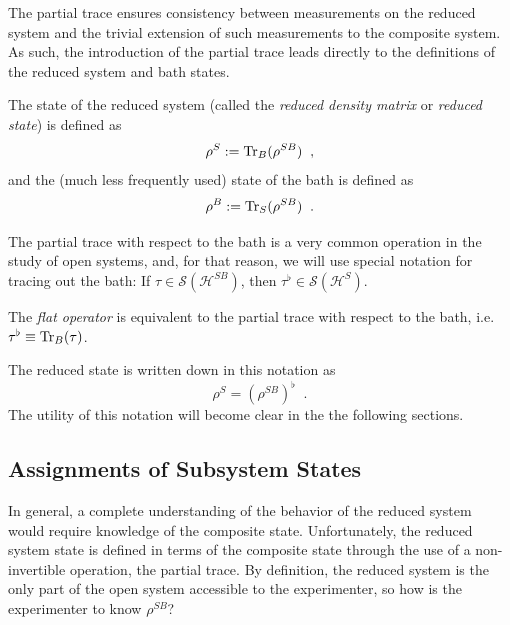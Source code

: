 The partial trace ensures consistency between measurements on the reduced system and the trivial extension of such measurements to the composite system.  As such, the introduction of the partial trace leads directly to the definitions of the reduced system and bath states.
\begin{definition}
The state of the reduced system (called the {\em reduced density matrix} or {\em reduced state}) is defined as
$$
\rho^S:=\operatorname{Tr}_B(\rho^{SB})\;\;,
$$
and the (much less frequently used) state of the bath is defined as
$$
\rho^B:=\operatorname{Tr}_S(\rho^{SB})\;\;.
$$
\end{definition}
The partial trace with respect to the bath is a very common operation in the study of open systems, and, for that reason, we will use special notation for tracing out the bath: If $\tau\in\mathcal{S}(\mathcal{H}^{SB})$, then $\tau^\flat\in\mathcal{S}(\mathcal{H}^S)$.  
\begin{definition}
The {\em flat operator} is equivalent to the partial trace with respect to the bath, i.e.\ $\tau^\flat\equiv\operatorname{Tr}_B(\tau)$.  
\end{definition}
The reduced state is written down in this notation as
$$
\rho^S = (\rho^{SB})^\flat\;\;.
$$
The utility of this notation will become clear in the the following sections.  

\subsection{Assignments of Subsystem States}
\label{sec:sharpop}

In general, a complete understanding of the behavior of the reduced system would require knowledge of the composite state.  Unfortunately, the reduced system state is defined in terms of the composite state through the use of a non-invertible operation, the partial trace.  By definition, the reduced system is the only part of the open system accessible to the experimenter, so how is the experimenter to know $\rho^{SB}$?  

